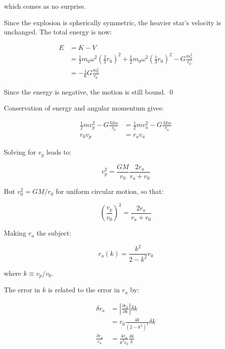 \documentclass[12pt]{article}
\begin{document}
which comes as no surprise.

Since the explosion is spherically symmetric, the heavier star's velocity is unchanged. The total energy is now:

\begin{equation}
\begin{split}
    E &= K - V \\
    &= \frac{1}{2} m_{0} \omega^{2} \left( \frac{2}{3} r_{0} \right)^{2} + \frac{1}{2} m_{0} \omega^{2} \left( \frac{1}{3} r_{0} \right)^{2} - G\frac{m_{0}^{2}}{r_{0}} \\
    &= - \frac{1}{6} G \frac{m_{0}^{2}}{r_{0}}
\end{split}
\end{equation}

Since the energy is negative, the motion is still bound.
\qed


Conservation of energy and angular momentum gives:

\begin{equation}
\begin{split}
    \frac{1}{2} m v_{p}^{2} - G \frac{Mm}{r_{0}} &= \frac{1}{2} m v_{a}^{2} - G \frac{Mm}{r_{a}} \\
    r_{0} v_{p} &= r_{a} v_{a}
\end{split}
\end{equation}

Solving for $v_{p}$ leads to:

\begin{equation}
    v_{p}^{2} = \frac{GM}{r_{0}} \frac{2r_{a}}{r_{a} + r_{0}}
\end{equation}

But $v_{0}^{2} = GM/r_{0}$ for uniform circular motion, so that:

\begin{equation}
    \left( \frac{v_{p}}{v_{0}} \right)^{2} = \frac{2r_{a}}{r_{a} + r_{0}}
\end{equation}

Making $r_{a}$ the subject:

\begin{equation}
    r_{a}(k) = \frac{k^{2}}{2 - k^{2}} r_{0}
\end{equation}

where $k \equiv v_{p}/v_{0}$.

The error in $k$ is related to the error in $r_{a}$ by:

\begin{equation}
\begin{split}
    \delta r_{a} &= \left\lvert \frac{\partial r_{a}}{\partial k} \right\rvert \delta k \\
    &= r_{0} \frac{4k}{(2 - k^{2})^{2}} \delta k \\
    \frac{\delta r_{a}}{r_{a}} &= \frac{4r_{a}}{k^{2} r_{0}} \frac{\delta k}{k} 
\end{split}
\end{equation}
\end{document}
